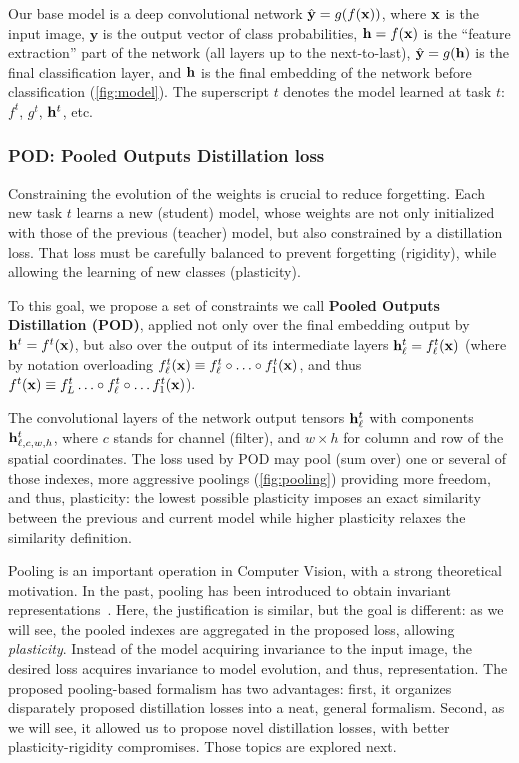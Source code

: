 Our base model is a deep convolutional network $\hat{\mathbf{y}} = g(f(\mathbf{x}))$, where $\mathbf{x}$ is the input image,
$\mathbf{y}$ is the output vector of class probabilities, $\mathbf{h} = f(\mathbf{x})$ is the ``feature
extraction'' part of the network (all layers up to the next-to-last), $\hat{\mathbf{y}} = g(\mathbf{h})$ is the final
classification layer, and $\mathbf{h}$ is the final embedding of the network before classification
(\autoref{fig:model}). The superscript $t$ denotes the model learned at task $t$:$f^{t}$, $g^{t}$,
$\mathbf{h}^{t}$, etc.


\subsubsection{POD: Pooled Outputs Distillation loss}
\label{sec:pod}

Constraining the evolution of the weights is crucial to reduce forgetting. Each new task $t$ learns
a new (student) model, whose weights are not only initialized with those of the previous (teacher)
model, but also constrained by a distillation loss. That loss must be carefully balanced to prevent
forgetting (rigidity), while allowing the learning of new classes (plasticity).

To this goal, we propose a set of constraints we call \textbf{Pooled Outputs Distillation (POD)},
applied not only over the final embedding output by $\mathbf{h}^{t}=f^{t}(\mathbf{x})$, but also over the output
of its intermediate layers $\mathbf{h}^{t}_\ell=f^{t}_\ell(\mathbf{x})$ (where by notation overloading
$f^{t}_\ell(\mathbf{x})\equiv f^{t}_\ell\circ\ldots\circ f^{t}_1(\mathbf{x})$, and thus $f^{t}(\mathbf{x})\equiv
    f^{t}_L\ldots\circ f^{t}_\ell\circ\ldots f^{t}_1(\mathbf{x})$).

The convolutional layers of the network output tensors $\mathbf{h}^{t}_{\ell}$ with components
$\mathbf{h}^{t}_{\ell,c,w,h}$, where $c$ stands for channel (filter), and $w\times h$ for column and row of
the spatial coordinates. The loss used by POD may pool (sum over) one or several of those indexes,
more aggressive poolings (\autoref{fig:pooling}) providing more freedom, and thus, plasticity: the
lowest possible plasticity imposes an exact similarity between the previous and current model while
higher plasticity relaxes the similarity definition.

Pooling is an important operation in Computer Vision, with a strong theoretical motivation. In the
past, pooling has been introduced to obtain invariant
representations~\cite{lowe1999sift,lazbnik2006spatial_pyramid_matching}. Here, the justification is
similar, but the goal is different: as we will see, the pooled indexes are aggregated in the
proposed loss, allowing \textit{plasticity}. Instead of the model acquiring invariance to the input
image, the desired loss acquires invariance to model evolution, and thus, representation.
%
The proposed pooling-based formalism has two advantages: first, it organizes disparately proposed
distillation losses into a neat, general formalism. Second, as we will see, it allowed us to propose
novel distillation losses, with better plasticity-rigidity compromises. Those topics are explored
next.

